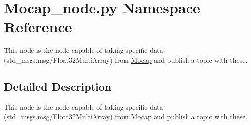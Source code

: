 \hypertarget{namespaceMocap__node_1_1py}{}\section{Mocap\+\_\+node.\+py Namespace Reference}
\label{namespaceMocap__node_1_1py}


This node is the node capable of taking specific data (std\+\_\+msgs.\+msg/\+Float32\+Multi\+Array) from \hyperlink{classMocap__node_1_1Mocap}{Mocap} and publish a topic with these.  




\subsection{Detailed Description}
This node is the node capable of taking specific data (std\+\_\+msgs.\+msg/\+Float32\+Multi\+Array) from \hyperlink{classMocap__node_1_1Mocap}{Mocap} and publish a topic with these. 

